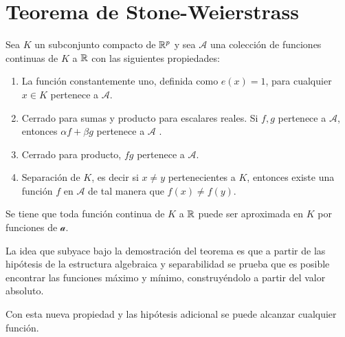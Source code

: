 %

\chapter{Teorema de Stone-Weierstrass }\label{ch:TeoremaStoneWeiertrass}

\begin{teorema}

    Sea $K$ un subconjunto compacto de $\mathbb{R}^p$ y sea $\mathcal{A}$ una colección de 
    funciones continuas de $K$ a $\mathbb{R}$ con las siguientes propiedades: 

    \begin{enumerate}
        \item La función constantemente uno, definida como $e(x)=1$, para cualquier $x\in K$ pertenece a $\mathcal{A}$.
        \item Cerrado para sumas y producto para escalares reales. Si $f,g$ pertenece a  $\mathcal{A}$, entonces $\alpha f + \beta g$ pertenece a $\mathcal{A}$ . 
        \item Cerrado para producto, $fg$ pertenece a $\mathcal{A}$. 
        \item Separación de $K$, es decir si $x \neq y$ pertenecientes a $K$, entonces existe una función $f$ en $\mathcal{A}$  de tal manera que $f(x) \neq f(y)$. 
    \end{enumerate}
    
    Se tiene que toda función continua de $K$ a $\mathbb{R}$ puede ser aproximada en $K$ por funciones de $\mathcal a$. 

\end{teorema}  

La idea que subyace bajo la demostración del teorema es que a partir de las hipótesis de la estructura algebraica y separabilidad se prueba que es posible encontrar las funciones máximo y mínimo, construyéndolo a partir del valor absoluto.   

Con esta nueva propiedad y las hipótesis adicional se puede alcanzar cualquier función. 

